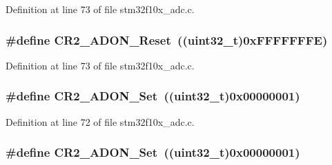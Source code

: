 Definition at line 73 of file stm32f10x\+\_\+adc.\+c.

\subsubsection[{\texorpdfstring{C\+R2\+\_\+\+A\+D\+O\+N\+\_\+\+Reset}{CR2_ADON_Reset}}]{\setlength{\rightskip}{0pt plus 5cm}\#define C\+R2\+\_\+\+A\+D\+O\+N\+\_\+\+Reset~(({\bf uint32\+\_\+t})0x\+F\+F\+F\+F\+F\+F\+F\+E)}\hypertarget{group___a_d_c___private___defines_gaa3eb5d77998387159508a57d7e09f459}{}\label{group___a_d_c___private___defines_gaa3eb5d77998387159508a57d7e09f459}


Definition at line 73 of file stm32f10x\+\_\+adc.\+c.

\subsubsection[{\texorpdfstring{C\+R2\+\_\+\+A\+D\+O\+N\+\_\+\+Set}{CR2_ADON_Set}}]{\setlength{\rightskip}{0pt plus 5cm}\#define C\+R2\+\_\+\+A\+D\+O\+N\+\_\+\+Set~(({\bf uint32\+\_\+t})0x00000001)}\hypertarget{group___a_d_c___private___defines_ga21779759f3d5d1389b114d7a1bb6fca1}{}\label{group___a_d_c___private___defines_ga21779759f3d5d1389b114d7a1bb6fca1}


Definition at line 72 of file stm32f10x\+\_\+adc.\+c.

\subsubsection[{\texorpdfstring{C\+R2\+\_\+\+A\+D\+O\+N\+\_\+\+Set}{CR2_ADON_Set}}]{\setlength{\rightskip}{0pt plus 5cm}\#define C\+R2\+\_\+\+A\+D\+O\+N\+\_\+\+Set~(({\bf uint32\+\_\+t})0x00000001)}\hypertarget{group___a_d_c___private___defines_ga21779759f3d5d1389b114d7a1bb6fca1}{}\label{group___a_d_c___private___defines_ga21779759f3d5d1389b114d7a1bb6fca1}


